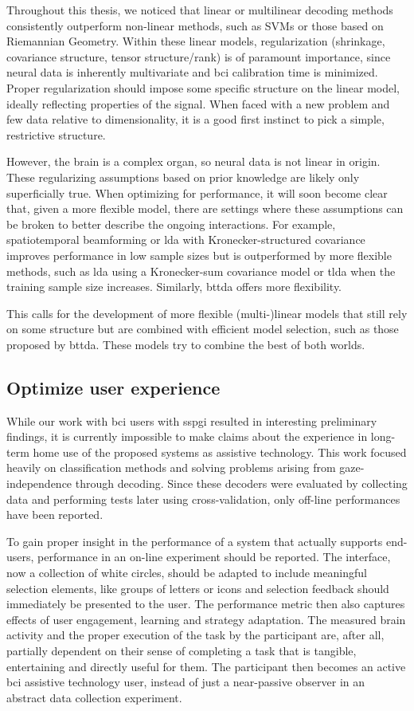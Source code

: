Throughout this thesis, we noticed that linear or multilinear decoding
methods consistently outperform non-linear methods, such as SVMs or those based
on Riemannian Geometry.
Within these linear models, regularization (shrinkage, covariance structure,
tensor structure/rank) is of paramount importance, since neural data is
inherently multivariate and \ac{bci} calibration time is minimized.
Proper regularization should impose some specific structure on the linear model,
ideally reflecting properties of the signal.
When faced with a new problem and few data relative to dimensionality, it is a
good first instinct to pick a simple, restrictive structure.

However, the brain is a complex organ, so neural data is not linear in origin.
These regularizing assumptions based on prior knowledge are likely only
superficially true.
When optimizing for performance, it will soon become clear that, given a more
flexible model, there are
settings where these assumptions can be broken to better describe the ongoing
interactions.
For example, spatiotemporal beamforming or \ac{lda} with Kronecker-structured covariance
improves performance in low sample sizes but is outperformed by more flexible
methods, such as \ac{lda} using a Kronecker-sum covariance model or \ac{tlda}
when the training sample size increases.
Similarly, \ac{bttda} offers more flexibility.

This calls for the development of more flexible (multi-)linear models that still rely on some
structure but are combined with efficient model
selection, such as those proposed by \ac{bttda}.
These models try to combine the best of both worlds.

\subsection{Optimize user experience}
While our work with \ac{bci} users with \ac{sspgi} resulted in interesting
preliminary findings, it is currently impossible to make claims about the
experience in long-term home use of the proposed systems as assistive technology.
This work focused heavily on classification methods and solving problems
arising from gaze-independence through decoding.
Since these decoders were evaluated by collecting data and performing tests
later using cross-validation, only off-line performances have been reported.

To gain proper insight in the performance of a system that actually supports
end-users, performance in an on-line experiment should be reported.
The interface, now a collection of white circles, should be adapted
to include meaningful selection elements, like groups of letters or icons and
selection feedback should immediately be presented to the user.
The performance metric then also captures effects of user engagement,
learning and strategy adaptation.
The measured brain activity and the proper execution of the task by the
participant are, after all, partially dependent on their sense of completing a task
that is tangible, entertaining and directly useful for them.
The participant then becomes an active \ac{bci} assistive technology user,
instead of just a near-passive observer in an abstract data collection experiment.

